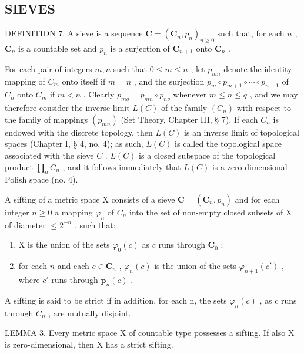 \subsection{SIEVES}

DEFINITION 7. A sieve is a sequence \(\mathbf{C} = (\mathbf{C}_n, p_n)_{n \geqslant 0}\) such that, for each \(n\) , \(\mathbf{C}_n\) is a countable set and \(p_n\) is a surjection of \(\mathbf{C}_{n+1}\) onto \(\mathbf{C}_n\) .

For each pair of integers \(m, n\) such that \(0 \leqslant m \leqslant n\) , let \(p_{mn}\) denote the identity mapping of \(C_m\) onto itself if \(m = n\) , and the surjection \(p_m \circ p_{m+1} \circ \cdots \circ p_{n-1}\) of \(C_n\) onto \(C_m\) if \(m < n\) . Clearly \(p_{mq} = p_{mn} \circ p_{ng}\) whenever \(m \leqslant n \leqslant q\) , and we may therefore consider the inverse limit \(L(C)\) of the family \((C_n)\) with respect to the family of mappings \((p_{mn})\) (Set Theory, Chapter III, § 7). If each \(C_n\) is endowed with the discrete topology, then \(L(C)\) is an inverse limit of topological spaces (Chapter I, § 4, no. 4); as such, \(L(C)\) is called the topological space associated with the sieve \(C\) . \(L(C)\) is a closed subspace of the topological product \(\prod_n C_n\) , and it follows immediately that \(L(C)\) is a zero-dimensional Polish space (no. 4).

A sifting of a metric space X consists of a sieve \(\mathbf{C} = (\mathbf{C}_{n}, p_{n})\) and for each integer \(n \geqslant 0\) a mapping \(\varphi_{n}\) of \(C_{n}\) into the set of non-empty closed subsets of X of diameter \(\leqslant 2^{-n}\) , such that:

\begin{enumerate}
\def\labelenumi{\alph{enumi})}
\item
  X is the union of the sets \(\varphi_0(c)\) as \(c\) runs through \(\mathbf{C}_0\) ;
\item
  for each \(n\) and each \(c \in \mathbf{C}_n\) , \(\varphi_n(c)\) is the union of the sets \(\varphi_{n+1}(c')\) , where \(c'\) runs through \(\overline{\pmb{p}}_n(c)\) .
\end{enumerate}

A sifting is said to be strict if in addition, for each n, the sets \(\varphi_{n}(c)\) , as c runs through \(C_{n}\) , are mutually disjoint.

LEMMA 3. Every metric space X of countable type possesses a sifting. If also X is zero-dimensional, then X has a strict sifting.

